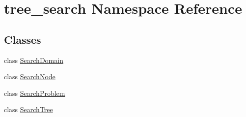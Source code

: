 \hypertarget{namespacetree__search}{}\section{tree\+\_\+search Namespace Reference}
\label{namespacetree__search}
\subsection*{Classes}
\begin{DoxyCompactItemize}
\item 
class \hyperlink{classtree__search_1_1_search_domain}{Search\+Domain}
\item 
class \hyperlink{classtree__search_1_1_search_node}{Search\+Node}
\item 
class \hyperlink{classtree__search_1_1_search_problem}{Search\+Problem}
\item 
class \hyperlink{classtree__search_1_1_search_tree}{Search\+Tree}
\end{DoxyCompactItemize}

